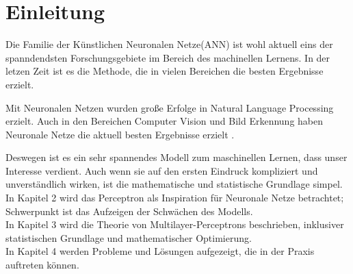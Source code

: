 
\section{Einleitung}
Die Familie der Künstlichen Neuronalen Netze(ANN) ist wohl aktuell eins der spanndendsten Forschungsgebiete im Bereich des machinellen Lernens. In der letzen Zeit ist es die Methode, die in vielen Bereichen die besten Ergebnisse erzielt. 

Mit Neuronalen Netzen wurden große Erfolge in Natural Language Processing erzielt. Auch in den Bereichen Computer Vision und Bild Erkennung haben Neuronale Netze die aktuell besten Ergebnisse erzielt \cite{LeCun2015}.

Deswegen ist es ein sehr spannendes Modell zum maschinellen Lernen, dass unser Interesse verdient. Auch wenn sie auf den ersten Eindruck kompliziert und unverständlich wirken, ist die mathematische und statistische Grundlage simpel.\\
In Kapitel 2 wird das Perceptron als Inspiration für Neuronale Netze betrachtet; Schwerpunkt ist das Aufzeigen der Schwächen des Modells. \\
In Kapitel 3 wird die Theorie von Multilayer-Perceptrons beschrieben, inklusiver statistischen Grundlage und mathematischer Optimierung. \\
In Kapitel 4 werden Probleme und Lösungen aufgezeigt, die in der Praxis auftreten können.
